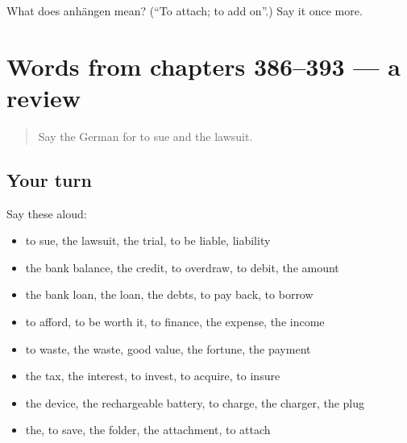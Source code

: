 \begin{tcolorbox}[breakable,colback=teal!4,colframe=teal!35!black,title={Before you move on}]
What does anhängen mean? (\textquotedblleft{}To attach; to add on\textquotedblright{}.) Say it once more.
\end{tcolorbox}
\section[(dialogue)]{Words from chapters 386–393 — a review}

\label{lesson:GE-R393-review-386-393}



\begin{quote}
Say the German for to sue and the lawsuit.
\end{quote}

\subsection*{Your turn}
Say these aloud:

\begin{itemize}
\raggedright
  \item to sue, the lawsuit, the trial, to be liable, liability
  \item the bank balance, the credit, to overdraw, to debit, the amount
  \item the bank loan, the loan, the debts, to pay back, to borrow
  \item to afford, to be worth it, to finance, the expense, the income
  \item to waste, the waste, good value, the fortune, the payment
  \item the tax, the interest, to invest, to acquire, to insure
  \item the device, the rechargeable battery, to charge, the charger, the plug
  \item the, to save, the folder, the attachment, to attach
\end{itemize}

